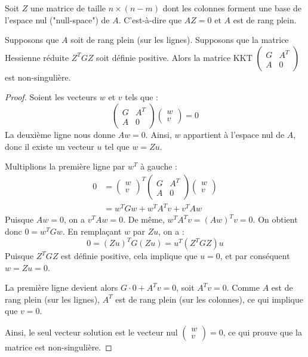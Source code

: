 Soit $Z$ une matrice de taille $n \times (n-m)$ dont les colonnes forment une base de l'espace nul ("null-space") de $A$. C'est-à-dire que $AZ = 0$ et $A$ est de rang plein.

\begin{lemme}
    Supposons que $A$ soit de rang plein (sur les lignes). Supposons que la matrice Hessienne réduite $Z^T G Z$ soit définie positive.
    Alors la matrice KKT $\begin{pmatrix} G & A^T \\ A & 0 \end{pmatrix}$ est non-singulière.
\end{lemme}

\begin{proof}
    Soient les vecteurs $w$ et $v$ tels que :
    \begin{equation}
        \begin{pmatrix}
            G & A^T \\
            A & 0
        \end{pmatrix}
        \begin{pmatrix}
            w \\
            v
        \end{pmatrix}
        = 0
    \end{equation}
    La deuxième ligne nous donne $Aw = 0$. Ainsi, $w$ appartient à l'espace nul de $A$, donc il existe un vecteur $u$ tel que $w = Zu$.
    
    Multiplions la première ligne par $w^T$ à gauche :
    \begin{align*}
        0 &= \begin{pmatrix} w \\ v \end{pmatrix}^T \begin{pmatrix} G & A^T \\ A & 0 \end{pmatrix} \begin{pmatrix} w \\ v \end{pmatrix} \\
          &= w^T G w + w^T A^T v + v^T A w
    \end{align*}
    Puisque $Aw = 0$, on a $v^T A w = 0$. De même, $w^T A^T v = (Aw)^T v = 0$.
    On obtient donc $0 = w^T G w$.
    En remplaçant $w$ par $Zu$, on a :
    \begin{equation}
        0 = (Zu)^T G (Zu) = u^T (Z^T G Z) u
    \end{equation}
    Puisque $Z^T G Z$ est définie positive, cela implique que $u = 0$, et par conséquent $w = Zu = 0$.
    
    La première ligne devient alors $G \cdot 0 + A^T v = 0$, soit $A^T v = 0$.
    Comme $A$ est de rang plein (sur les lignes), $A^T$ est de rang plein (sur les colonnes), ce qui implique que $v = 0$.
    
    Ainsi, le seul vecteur solution est le vecteur nul $\begin{pmatrix} w \\ v \end{pmatrix} = 0$, ce qui prouve que la matrice est non-singulière.
\end{proof}

